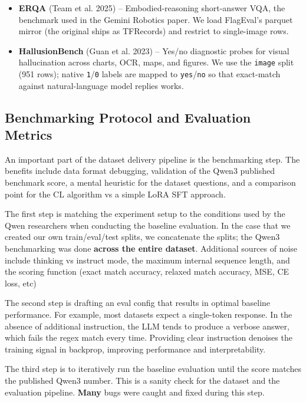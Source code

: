 \documentclass{article}
\begin{document}
\begin{itemize}
				(yes/no), and \texttt{configuration} (short phrase). Pointing answers are scored against a
				per-row binary mask, and the Qwen3-VL JSON suffix is baked into context-row questions at
				preprocess time so the runner stays task-agnostic.
		\item \textbf{ERQA} (Team et al. 2025) -- Embodied-reasoning short-answer VQA, the benchmark
				used in the Gemini Robotics paper. We load FlagEval's parquet mirror (the original ships as
				TFRecords) and restrict to single-image rows.
		\item \textbf{HallusionBench} (Guan et al. 2023) -- Yes/no diagnostic probes for visual
				hallucination across charts, OCR, maps, and figures. We use the \texttt{image} split (951
				rows); native \texttt{1}/\texttt{0} labels are mapped to \texttt{yes}/\texttt{no} so that
				exact-match against natural-language model replies works.
\end{itemize}

\subsection{Benchmarking Protocol and Evaluation Metrics}\label{sec:benchmarking}
An important part of the dataset delivery pipeline is the benchmarking step. The benefits include data format
debugging, validation of the Qwen3 published benchmark score, a mental heuristic for the dataset questions,
and a comparison point for the CL algorithm vs a simple LoRA SFT approach.

The first step is matching the experiment setup to the conditions used by the Qwen researchers when
conducting the baseline evaluation. In the case that we created our own train/eval/test
splits, we concatenate the splits; the Qwen3 benchmarking was done \textbf{across the entire dataset}.
Additional sources of noise include thinking vs instruct mode, the maximum internal sequence length, and the
scoring function (exact match accuracy, relaxed match accuracy, MSE, CE loss, etc)

The second step is drafting an eval config that results in optimal baseline performance. For example, most
datasets expect a single-token response. In the absence of additional instruction, the LLM tends to produce
a verbose answer, which fails the regex match every time. Providing clear instruction denoises the training
signal in backprop, improving performance and interpretability.

The third step is to iteratively run the baseline evaluation until the score matches the published Qwen3
number. This is a sanity check for the dataset and the evaluation pipeline. \textbf{Many} bugs were caught
and fixed during this step.
\end{document}

